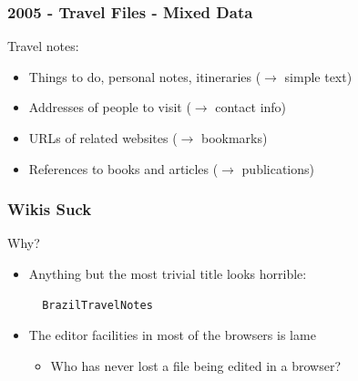 \documentclass[compress,trans]{beamer}
\begin{document}
\begin{frame}[fragile]
  \frametitle{2005 - Travel Files - Mixed Data}

Travel notes:
\begin{itemize}
\item Things to do, personal notes, itineraries ($\rightarrow$ simple text)
\item Addresses of people to visit ($\rightarrow$ contact info)
\item URLs of related websites ($\rightarrow$ bookmarks)
\item References to books and articles ($\rightarrow$ publications)
\end{itemize}




% 
% 
% 
% 
%
% 


\end{frame}


\begin{frame}[fragile]
  \frametitle{Wikis Suck}

Why?

\begin{itemize}

\item Anything but the most trivial title looks horrible:

\begin{verbatim}
  BrazilTravelNotes
\end{verbatim}

\item The editor facilities in most of the browsers is lame
  \begin{itemize}
  \item Who has never lost a file being edited in a browser?
  \end{itemize}


\end{itemize}

\end{frame}
\end{document}
